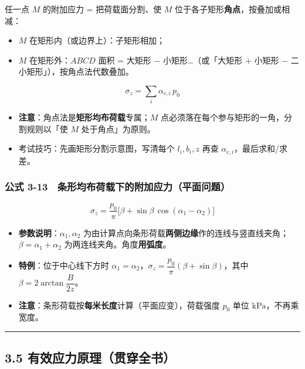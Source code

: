 \documentclass[
]{article}
\providecommand{\tightlist}{%
  \setlength{\itemsep}{0pt}\setlength{\parskip}{0pt}}
\begin{document}
任一点 \(M\) 的附加应力 = 把荷载面分割、使 \(M\)
位于各子矩形\textbf{角点}，按叠加或相减：

\begin{itemize}
\tightlist
\item
  \(M\) 在矩形内（或边界上）：子矩形相加；
\item
  \(M\) 在矩形外：\(ABCD\) 面积 = 大矩形 − 小矩形\ldots（或「大矩形 +
  小矩形 − 二小矩形」），按角点法代数叠加。
\end{itemize}

\[\sigma_z=\sum_{i}\alpha_{c,i}\,p_0\]

\begin{itemize}
\tightlist
\item
  \textbf{注意}：角点法是\textbf{矩形均布荷载}专属；\(M\)
  点必须落在每个参与矩形的一角，分割规则以「使 \(M\) 处于角点」为原则。
\item
  考试技巧：先画矩形分割示意图，写清每个 \(l_i,b_i,z\) 再查
  \(\alpha_{c,i}\)，最后求和/求差。
\end{itemize}

\subsubsection{公式
3-13　条形均布荷载下的附加应力（平面问题）}\label{ux516cux5f0f-3-13-ux6761ux5f62ux5747ux5e03ux8377ux8f7dux4e0bux7684ux9644ux52a0ux5e94ux529bux5e73ux9762ux95eeux9898}

\[\sigma_z=\frac{p_0}{\pi}\Big[\beta+\sin\beta\,\cos(\alpha_1-\alpha_2)\Big]\]

\begin{itemize}
\tightlist
\item
  \textbf{参数说明}：\(\alpha_1,\alpha_2\)
  为由计算点向条形荷载\textbf{两侧边缘}作的连线与竖直线夹角；\(\beta=\alpha_1+\alpha_2\)
  为两连线夹角。角度\textbf{用弧度}。
\item
  \textbf{特例}：位于中心线下方时
  \(\alpha_1=\alpha_2\)，\(\sigma_z=\dfrac{p_0}{\pi}(\beta+\sin\beta)\)，其中
  \(\beta=2\arctan\dfrac{B}{2z}\)。
\item
  \textbf{注意}：条形荷载按\textbf{每米长度}计算（平面应变），荷载强度
  \(p_0\) 单位 \(\mathrm{kPa}\)，不再乘宽度。
\end{itemize}

\begin{center}\rule{0.5\linewidth}{0.5pt}\end{center}

\subsection{3.5
有效应力原理（贯穿全书）}\label{ux6709ux6548ux5e94ux529bux539fux7406ux8d2fux7a7fux5168ux4e66}
\end{document}
